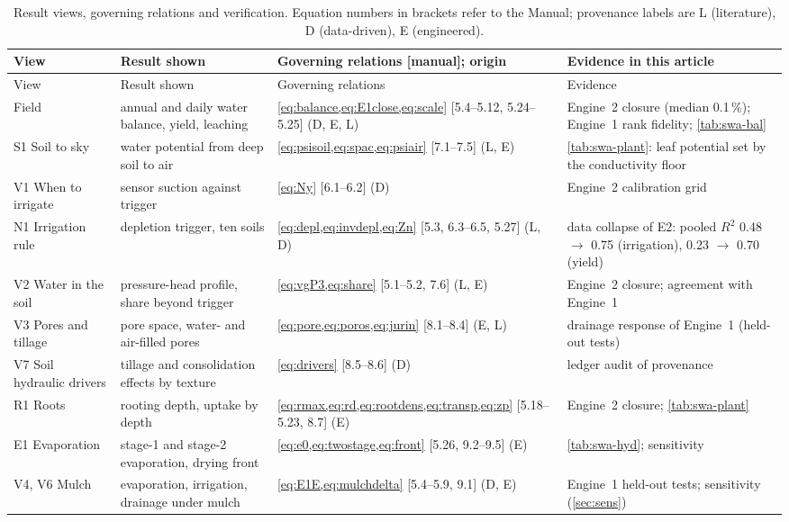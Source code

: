 {\small
\begin{longtable}{>{\raggedright\arraybackslash}p{2.3cm}>{\raggedright\arraybackslash}p{3.3cm}>{\raggedright\arraybackslash}p{4.6cm}>{\raggedright\arraybackslash}p{4.0cm}}
\caption{Result views, governing relations and verification. Equation numbers in brackets refer to the Manual; provenance labels are L (literature), D (data-driven), E (engineered).}\label{tab:views}\\
\toprule
View & Result shown & Governing relations [manual]; origin & Evidence in this article\\\midrule\endfirsthead
\toprule View & Result shown & Governing relations & Evidence\\\midrule\endhead
Field & annual and daily water balance, yield, leaching & \cref{eq:balance,eq:E1close,eq:scale} [5.4--5.12, 5.24--5.25] (D, E, L) & Engine~2 closure (median 0.1\,\%); Engine~1 rank fidelity; \cref{tab:swa-bal}\\
S1 Soil to sky & water potential from deep soil to air & \cref{eq:psisoil,eq:spac,eq:psiair} [7.1--7.5] (L, E) & \cref{tab:swa-plant}: leaf potential set by the conductivity floor\\
V1 When to irrigate & sensor suction against trigger & \cref{eq:Ny} [6.1--6.2] (D) & Engine~2 calibration grid\\
N1 Irrigation rule & depletion trigger, ten soils & \cref{eq:depl,eq:invdepl,eq:Zn} [5.3, 6.3--6.5, 5.27] (L, D) & data collapse of E2: pooled $R^2$ 0.48 $\to$ 0.75 (irrigation), 0.23 $\to$ 0.70 (yield)\\
V2 Water in the soil & pressure-head profile, share beyond trigger & \cref{eq:vgP3,eq:share} [5.1--5.2, 7.6] (L, E) & Engine~2 closure; agreement with Engine~1\\
V3 Pores and tillage & pore space, water- and air-filled pores & \cref{eq:pore,eq:poros,eq:jurin} [8.1--8.4] (E, L) & drainage response of Engine~1 (held-out tests)\\
V7 Soil hydraulic drivers & tillage and consolidation effects by texture & \cref{eq:drivers} [8.5--8.6] (D) & ledger audit of provenance\\
R1 Roots & rooting depth, uptake by depth & \cref{eq:rmax,eq:rd,eq:rootdens,eq:transp,eq:zp} [5.18--5.23, 8.7] (E) & Engine~2 closure; \cref{tab:swa-plant}\\
E1 Evaporation & stage-1 and stage-2 evaporation, drying front & \cref{eq:e0,eq:twostage,eq:front} [5.26, 9.2--9.5] (E) & \cref{tab:swa-hyd}; sensitivity\\
V4, V6 Mulch & evaporation, irrigation, drainage under mulch & \cref{eq:E1E,eq:mulchdelta} [5.4--5.9, 9.1] (D, E) & Engine~1 held-out tests; sensitivity (\cref{sec:sens})\\

\end{longtable}}
